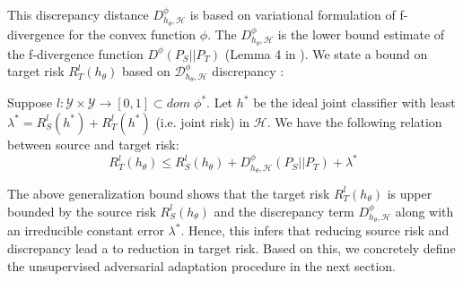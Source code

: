 \documentclass[table,dvipsnames]{article}
\theoremstyle{plain}
\theoremstyle{definition}
\theoremstyle{remark}
\begin{document}
This discrepancy distance $D_{h_{\theta}, \mathcal{H}}^\phi$ is based on variational formulation of f-divergence \citep{nguyen2010estimating} for the convex function $\phi$. The $D_{h_{\theta}, \mathcal{H}}^{\phi}$ is the lower bound estimate of the f-divergence function $D^{\phi}(P_S||P_T)$ (Lemma 4 in \citep{acuna2021f}). We state a bound on target risk $R_{T}^l(h_{\theta})$ based on $\mathcal D_{h_{\theta},\mathcal{H}}^\phi$ discrepancy \citep{acuna2021f}:
\begin{theorem}
\label{th:gen-bound}
Suppose $l: \mathcal{Y} \times \mathcal{Y} \rightarrow [0,1] \subset dom \; \phi^*$. Let $h^*$ be the ideal joint classifier with {least} $\lambda^* = R_S^l(h^*) +  R_T^l(h^*)$ {(i.e. joint risk)} in $\mathcal{H}$. We have the following relation between source and target risk:
\begin{equation}
    R_{T}^l(h_{\theta}) \leq R_{S}^{l}(h_{\theta}) + D_{h_{\theta}, \mathcal{H}}^{\phi} (P_S || P_T) + \lambda^*
\end{equation}
\end{theorem}
The above generalization bound shows that the target risk $R_T^l(h_{\theta})$ is upper bounded by the source risk $R_S^l(h_{\theta})$ and the discrepancy term $D_{h_{\theta}, \mathcal{H}}^\phi$ along with an irreducible constant error $\lambda^*$. Hence, this infers that reducing source risk and discrepancy lead a to reduction in target risk. Based on this, we concretely define the unsupervised adversarial adaptation procedure in the next section.
\end{document}
